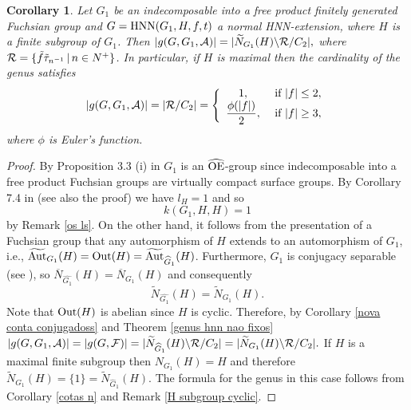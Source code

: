 \documentclass[a4paper,12pt]{article}
\newtheorem{cor}[thm]{Corollary}
\newcommand{\A}{{\cal A}}
\newcommand{\Oe}{\rm \widehat{OE}}
\newcommand{\cR}{{\cal R}}
\def\aut {{\rm Aut}}
\def\out {{\rm Out}}
\def\hnn {{\rm HNN}}
\begin{document}
{%

\begin{cor} Let $G_1$ be an indecomposable into a free product finitely generated Fuchsian group and $G=\hnn(G_1, H, f, t)$ a normal HNN-extension, where $H$ is a finite subgroup of $G_1$. Then $|g(G,G_1,\A)|=|\widetilde{N}_{G_1}(H)\backslash \cR/C_2|,$ where  %
$\cR=
\{\tilde f \tilde \tau_{n^{-1}}\,|\, n \in N^{+}\}$.
  In particular, if $H$ is maximal then the cardinality of the genus satisfies $$|g(G,G_1,\A)|=|\mathcal{R}/C_2| = \left\{\begin{array}{cc}
  1,&\mbox{ if } |f| \leq 2,\\
\displaystyle\frac{\phi(|f|)}{2}, &\mbox{ if } | f| \geq 3,
\end{array}\right.$$
where $\phi$ is Euler's function. %
\end{cor} 


\begin{proof} 
By Proposition 3.3 (i) in \cite{BPZ2} $G_1$ is an $\Oe$-group since indecomposable into a free product Fuchsian groups are virtually compact surface groups. By Corollary 7.4  in \cite{BPZ2} (see also the proof) we have  $l_H=1$ and so $$k(G_1, H, H)=1$$ by Remark \ref{os ls}. On the other hand, it follows from the presentation of a Fuchsian group that any automorphism of $H$ extends to an automorphism of $G_1$, i.e., $\widetilde{\aut}_{G_1}(H)=\out(H)=\widetilde{\aut}_{\widehat{G}_1}(H)$. Furthermore, $G_1$ is conjugacy separable  (see \cite{fine}), so $\overline{N}_{\widehat{G_1}}(H)=\overline{N}_{G_1}(H)$ and consequently $$\widetilde{N}_{\widehat{G_1}}(H)=\widetilde{N}_{G_1}(H).$$ Note that $\out(H)$ is abelian since $H$ is cyclic. Therefore, by Corollary \ref{nova conta conjugadoss} %
and Theorem \ref{genus hnn nao fixos} $|g(G,G_1,\A)|=|g(G,\mathcal{F})|= |\widetilde{N}_{\widehat G_1}(H)\backslash\mathcal{R}/C_2|=|\widetilde{N}_{G_1}(H)\backslash \cR/C_2|.$ If $H$ is a maximal finite subgroup then $N_{G_1}(H)=H$ and therefore $\widetilde{N}_{G_1}(H)=\{1\}=\widetilde{N}_{\widehat{G}_1}(H).$ The formula for the genus in this case follows from Corollary \ref{cotas n} and Remark \ref{H subgroup cyclic}.
\end{proof}

}
\end{document}
